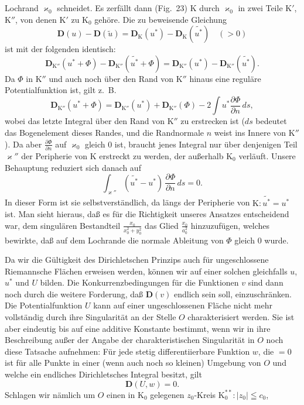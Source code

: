 \documentclass{article}
\begin{document}
Lochrand $\varkappa_0$ schneidet. Es zerfällt dann (Fig.~23) $\mathrm{K}$ durch $\varkappa_0$ in zwei Teile $\mathrm{K}'$, $\mathrm{K}''$, von denen $\mathrm{K}'$ zu $\mathrm{K}_0$ gehöre. Die zu beweisende Gleichung
\[ \mathbf{D}(u) - \mathbf{D}(\tilde{u}) = \mathbf{D}_{\mathrm{K}}(u^*) - \mathbf{D}_{\mathrm{K}}(\widetilde{u^*}) \quad (> 0) \]
ist mit der folgenden identisch:
\[ \mathbf{D}_{\mathrm{K}''}(u^* + \Phi) - \mathbf{D}_{\mathrm{K}''}(\widetilde{u^*} + \Phi) = \mathbf{D}_{\mathrm{K}''}(u^*) - \mathbf{D}_{\mathrm{K}''}(\widetilde{u^*}). \tag{28} \]
Da $\Phi$ in $\mathrm{K}''$ und auch noch über den Rand von $\mathrm{K}''$ hinaus eine reguläre Potentialfunktion ist, gilt z.~B.
\[ \mathbf{D}_{\mathrm{K}''}(u^* + \Phi) = \mathbf{D}_{\mathrm{K}''}(u^*) + \mathbf{D}_{\mathrm{K}''}(\Phi) - 2 \int u^* \frac{\partial\Phi}{\partial n}\,ds, \]
wobei das letzte Integral über den Rand von $\mathrm{K}''$ zu erstrecken ist ($ds$ bedeutet das Bogenelement dieses Randes, und die Randnormale $n$ weist ins Innere von $\mathrm{K}''$). Da aber $\frac{\partial\Phi}{\partial n}$ auf $\varkappa_0$ gleich $0$ ist, braucht jenes Integral nur über denjenigen Teil $\varkappa''$ der Peripherie von $\mathrm{K}$ erstreckt zu werden, der außerhalb $\mathrm{K}_0$ verläuft. Unsere Behauptung reduziert sich danach auf
\[ \int_{\varkappa''} (\widetilde{u^*} - u^*)\,\frac{\partial\Phi}{\partial n}\,ds = 0. \]
In dieser Form ist sie selbstverständlich, da längs der Peripherie von $\mathrm{K}\colon \widetilde{u^*} = u^*$ ist. Man sieht hieraus, daß es für die Richtigkeit unseres Ansatzes entscheidend war, dem singulären Bestandteil $\frac{x_0}{x_0^2 + y_0^2}$ das Glied $\frac{x_0}{a_0^2}$ hinzuzufügen, welches bewirkte, daß auf dem Lochrande die normale Ableitung von $\Phi$ gleich $0$ wurde.

Da wir die Gültigkeit des Dirichletschen Prinzips auch für ungeschlossene Riemannsche Flächen erweisen werden, können wir auf einer solchen gleichfalls $u$, $u^*$ und $U$ bilden. Die Konkurrenzbedingungen für die Funktionen $v$ sind dann noch durch die weitere Forderung, daß $\mathbf{D}(v)$ endlich sein soll, einzuschränken. Die Potentialfunktion $U$ kann auf einer ungeschlossenen Fläche nicht mehr vollständig durch ihre Singularität an der Stelle $O$ charakterisiert werden. Sie ist aber eindeutig bis auf eine additive Konstante bestimmt, wenn wir in ihre Beschreibung außer der Angabe der charakteristischen Singularität in $O$ noch diese Tatsache aufnehmen: Für jede stetig differentiierbare Funktion $w$, die $= 0$ ist für alle Punkte in einer (wenn auch noch so kleinen) Umgebung von $O$ und welche ein endliches Dirichletsches Integral besitzt, gilt
\[ \mathbf{D}(U, w) = 0. \]
Schlagen wir nämlich um $O$ einen in $\mathrm{K}_0$ gelegenen $z_0$-Kreis $\mathrm{K}_0^{**}\colon |z_0| \leqq c_0$,
\end{document}
